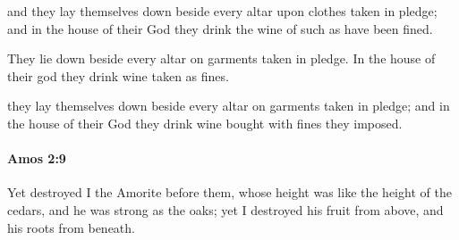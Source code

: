			\begin{versebox}
					\item[BHS] 
					\item[LXX] 
					\item[ASV] and they lay themselves down beside every altar upon clothes taken in pledge; and in the house of their God they drink the wine of such as have been fined.
					\item[NIV] They lie down beside every altar on garments taken in pledge. In the house of their god they drink wine taken as fines.
					\item[NRSV] they lay themselves down beside every altar on garments taken in pledge; and in the house of their God they drink wine bought with fines they imposed.
			\end{versebox}

		\paragraph{Amos 2:9} %
			\label{AMOS-2-9}

			Yet destroyed I the Amorite before them, whose height was like the height of the cedars, and he was strong as the oaks; yet I destroyed his fruit from above, and his roots from beneath.

